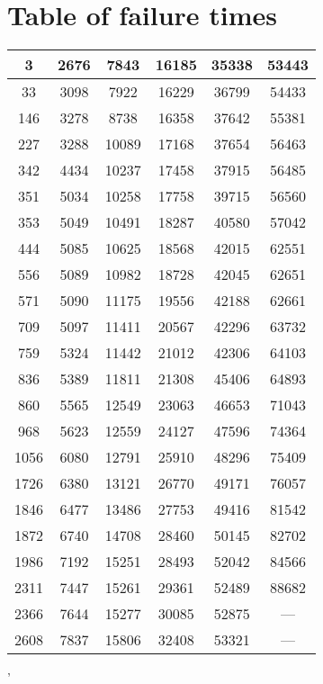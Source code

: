 \section{Table of failure times}
\label{table-failure}
\begin{center}
    \begin{tabular}{|c|c|c|c|c|c|}
    \hline
 3 & 2676 & 7843 & 16185 & 35338 & 53443 \\
 \hline
 33 & 3098 & 7922 & 16229 & 36799 & 54433 \\
 \hline
 146 & 3278 & 8738 & 16358 & 37642 & 55381 \\
 \hline
 227 & 3288 & 10089 & 17168 & 37654 & 56463 \\
 \hline
 342 & 4434 & 10237 & 17458 & 37915 & 56485 \\
 \hline
 351 & 5034 & 10258 & 17758 & 39715 & 56560 \\
 \hline
 353 & 5049 & 10491 & 18287 & 40580 & 57042 \\
 \hline
 444 & 5085 & 10625 & 18568 & 42015 & 62551 \\
 \hline
 556 & 5089 & 10982 & 18728 & 42045 & 62651 \\
 \hline
 571 & 5090 & 11175 & 19556 & 42188 & 62661 \\
 \hline
 709 & 5097 & 11411 & 20567 & 42296 & 63732 \\
 \hline
 759 & 5324 & 11442 & 21012 & 42306 & 64103 \\
 \hline
 836 & 5389 & 11811 & 21308 & 45406 & 64893 \\
 \hline
 860 & 5565 & 12549 & 23063 & 46653 & 71043 \\
 \hline
 968 & 5623 & 12559 & 24127 & 47596 & 74364 \\
 \hline
 1056 & 6080 & 12791 & 25910 & 48296 & 75409 \\
 \hline
 1726 & 6380 & 13121 & 26770 & 49171 & 76057 \\
 \hline
 1846 & 6477 & 13486 & 27753 & 49416 & 81542 \\
 \hline
 1872 & 6740 & 14708 & 28460 & 50145 & 82702 \\
 \hline
 1986 & 7192 & 15251 & 28493 & 52042 & 84566 \\
 \hline
 2311 & 7447 & 15261 & 29361 & 52489 & 88682 \\
 \hline
 2366 & 7644 & 15277 & 30085 & 52875 & --- \\
 \hline
 2608 & 7837 & 15806 & 32408 & 53321 & --- \\
 \hline
\end{tabular}
\end{center}'


